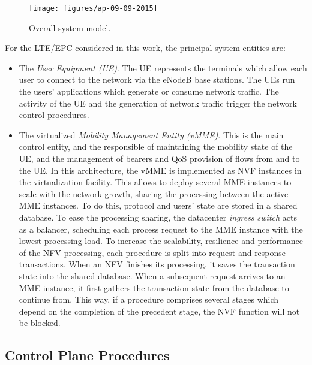 \documentclass[conference]{IEEEtran}
\begin{document}
\begin{figure}[tb]
\begin{center}
\texttt{[image: figures/ap-09-09-2015]}
\end{center}
\caption{Overall system model.}
\label{fig:5g-arch}
\end{figure}


 For the LTE/EPC considered in this work, the principal system entities are:
\begin{itemize}
	\item The \emph{User Equipment (UE)}. The UE represents the terminals which allow each user to connect to the network via the eNodeB base stations. The UEs run the users' applications which generate or consume network traffic. The activity of the UE and the generation of network traffic trigger the network control procedures.






\item The virtualized \emph{Mobility Management Entity (vMME)}. This is the main control entity, and the responsible of maintaining the mobility state of the UE, and the management of bearers and QoS provision of flows from and to the UE. In this architecture, the vMME is implemented as NVF instances in the virtualization facility. This allows to deploy several MME instances to scale with the network growth, sharing the processing between the active MME instances. To do this, protocol and users' state are stored in a shared database.
  To ease the processing sharing, the datacenter \emph{ingress switch} acts as a balancer, scheduling each process request to the MME instance with the lowest processing load. To increase the scalability, resilience and performance of the NFV processing, each procedure is split into request and response transactions. When an NFV finishes its processing, it saves the transaction state into the shared database. When a subsequent request arrives to an MME instance, it first gathers the transaction state from the database to continue from. 
  This way, if a procedure comprises several stages which depend on the completion of the precedent stage, the NVF function will not be blocked. 


 \end{itemize}









\subsection{Control Plane Procedures} \label{sec:control-plane-procedures}
\end{document}
